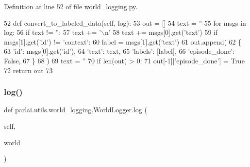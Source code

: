 Definition at line 52 of file world\+\_\+logging.\+py.


\begin{DoxyCode}
52     \textcolor{keyword}{def }convert\_to\_labeled\_data(self, log):
53         out = []
54         text = \textcolor{stringliteral}{''}
55         \textcolor{keywordflow}{for} msgs \textcolor{keywordflow}{in} log:
56             \textcolor{keywordflow}{if} text != \textcolor{stringliteral}{''}:
57                 text += \textcolor{stringliteral}{'\(\backslash\)n'}
58             text += msgs[0].get(\textcolor{stringliteral}{'text'})
59             \textcolor{keywordflow}{if} msgs[1].get(\textcolor{stringliteral}{'id'}) != \textcolor{stringliteral}{'context'}:
60                 label = msgs[1].get(\textcolor{stringliteral}{'text'})
61                 out.append(
62                     \{
63                         \textcolor{stringliteral}{'id'}: msgs[0].get(\textcolor{stringliteral}{'id'}),
64                         \textcolor{stringliteral}{'text'}: text,
65                         \textcolor{stringliteral}{'labels'}: [label],
66                         \textcolor{stringliteral}{'episode\_done'}: \textcolor{keyword}{False},
67                     \}
68                 )
69                 text = \textcolor{stringliteral}{''}
70         \textcolor{keywordflow}{if} len(out) > 0:
71             out[-1][\textcolor{stringliteral}{'episode\_done'}] = \textcolor{keyword}{True}
72         \textcolor{keywordflow}{return} out
73 
\end{DoxyCode}
\mbox{\label{classparlai_1_1utils_1_1world__logging_1_1WorldLogger_a98460ce773e615dabd51e1f3ffb45db3}} 
\subsubsection{\texorpdfstring{log()}{log()}}
{\footnotesize\ttfamily def parlai.\+utils.\+world\+\_\+logging.\+World\+Logger.\+log (\begin{DoxyParamCaption}\item[{}]{self,  }\item[{}]{world }\end{DoxyParamCaption})}



